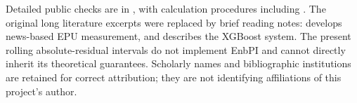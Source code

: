 Detailed public checks are in , with calculation procedures including . The original long literature excerpts were replaced by brief reading notes: \citet{BakerBloomDavis2016} develops news-based EPU measurement, and \citet{ChenGuestrin2016} describes the XGBoost system. The present rolling absolute-residual intervals do not implement EnbPI \citep{XuXie2021} and cannot directly inherit its theoretical guarantees. Scholarly names and bibliographic institutions are retained for correct attribution; they are not identifying affiliations of this project's author.
